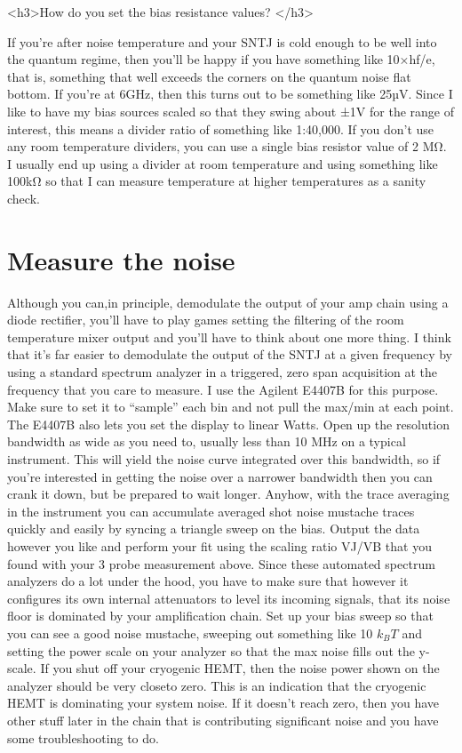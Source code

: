 \documentclass[11pt]{article}
\begin{document}
<h3>How do you set the bias resistance values? </h3>



If you’re after noise temperature and your SNTJ is cold enough to be well into the quantum regime, then you’ll be happy if you have something like 10×hf/e, that is, something that well exceeds the corners on the quantum noise ﬂat bottom. If you’re at 6GHz, then this turns out to be something like 25µV. Since I like to have my bias sources scaled so that they swing about ±1V for the range of interest, this means a divider ratio of something like 1:40,000. If you don’t use any room temperature dividers, you can use a single bias resistor value of 2 MΩ. I usually end up using a divider at room temperature and using something like 100kΩ so that I can measure temperature at higher temperatures as a sanity check.


\section{
Measure the noise }



Although you can,in principle, demodulate the output of your amp chain using a diode rectifier, you’ll have to play games setting the ﬁltering of the room temperature mixer output and you’ll have to think about one more thing. I think that it’s far easier to demodulate the output of the SNTJ at a given frequency by using a standard spectrum analyzer in a triggered, zero span acquisition at the frequency that you care to measure. I use the Agilent E4407B for this purpose. Make sure to set it to “sample” each bin and not pull the max/min at each point. The E4407B also lets you set the display to linear Watts. Open up the resolution bandwidth as wide as you need to, usually less than 10 MHz on a typical instrument. This will yield the noise curve integrated over this bandwidth, so if you’re interested in getting the noise over a narrower bandwidth then you can crank it down, but be prepared to wait longer. Anyhow, with the trace averaging in the instrument you can accumulate averaged shot noise mustache traces quickly and easily by syncing a triangle sweep on the bias. Output the data however you like and perform your ﬁt using the scaling ratio VJ/VB that you found with your 3 probe measurement above. Since these automated spectrum analyzers do a lot under the hood, you have to make sure that however it conﬁgures its own internal attenuators to level its incoming signals, that its noise ﬂoor is dominated by your amplification chain. Set up your bias sweep so that you can see a good noise mustache, sweeping out something like 10 $k_BT$  and setting the power scale on your analyzer so that the max noise fills out the y-scale. If you shut off your cryogenic HEMT, then the noise power shown on the analyzer should be very closeto zero. This is an indication that the cryogenic HEMT is dominating your system noise. If it doesn’t reach zero, then you have other stuff later in the chain that is contributing significant noise and you have some troubleshooting to do.
\end{document}
